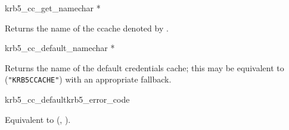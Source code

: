 \begin{funcdecl}{krb5_cc_get_name}{char *}{\funcin}
\end{funcdecl}

Returns the name of the ccache denoted by .

\begin{funcdecl}{krb5_cc_default_name}{char *}{\funcvoid}
\end{funcdecl}

Returns the name of the default credentials cache; this may be equivalent to
({\tt "KRB5CCACHE"}) with an appropriate fallback.

\begin{funcdecl}{krb5_cc_default}{krb5_error_code}{\funcout}
\end{funcdecl}

Equivalent to
(,
).


